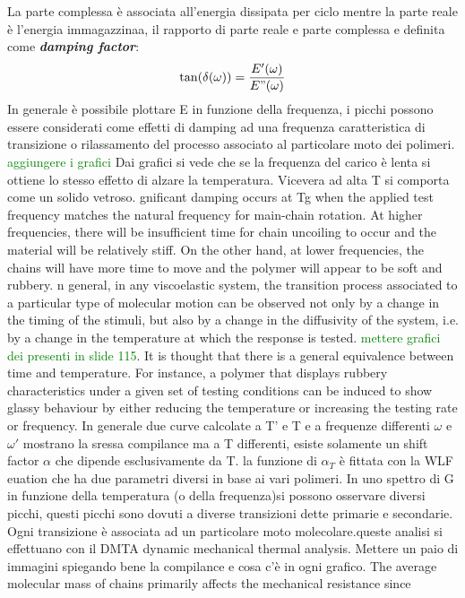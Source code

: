 La parte complessa è associata all'energia dissipata per ciclo mentre la parte reale è l'energia immagazzinaa, il rapporto di parte reale e parte complessa e definita come \textbf{\textit{damping factor}}:
\begin{equation}
    \tan(\delta(\omega))=\frac{E'(\omega)}{E"(\omega)}
\end{equation}
In generale è possibile plottare E in funzione della frequenza, i picchi possono essere considerati come effetti di damping ad una frequenza caratteristica di transizione o rilassamento del processo associato al particolare moto dei polimeri.
\textcolor{green}{aggiungere i grafici} Dai grafici si vede che se la frequenza del carico è lenta si ottiene lo stesso effetto di alzare la temperatura. Vicevera ad alta T si comporta come un solido vetroso.
gnificant damping occurs at Tg when the applied test frequency matches the 
natural frequency for main-chain rotation. At higher frequencies, there will be 
insufficient time for chain uncoiling to occur and the material will be relatively 
stiff. On the other hand, at lower frequencies, the chains will have more time 
to move and the polymer will appear to be soft and rubbery. n general, in any viscoelastic system, the transition process associated to a 
particular type of molecular motion can be observed not only by a change in 
the timing of the stimuli, but also by a change in the diffusivity of the system, 
i.e. by a change in the temperature at which the response is tested. \textcolor{green}{mettere grafici dei presenti in slide 115}. It is thought that there is a general equivalence between time and temperature. 
For instance, a polymer that displays rubbery characteristics under a given set 
of testing conditions can be induced to show glassy behaviour by either 
reducing the temperature or increasing the testing rate or frequency. 
In generale due curve calcolate a T' e T e a frequenze differenti $\omega$ e $\omega'$ mostrano la sressa compilance ma a T differenti, esiste solamente un shift factor $\alpha$ che dipende esclusivamente da T. la funzione di $\alpha_T$ è fittata con la WLF euation che ha due parametri diversi in base ai vari polimeri. In uno spettro di G in funzione della temperatura (o della frequenza)si possono osservare diversi picchi, questi picchi sono dovuti a diverse transizioni dette primarie e secondarie. Ogni transizione è associata ad un particolare moto molecolare.queste analisi si effettuano con il DMTA dynamic mechanical thermal analysis. Mettere un paio di immagini spiegando bene la compilance e cosa c'è in ogni grafico.  The average molecular mass of chains primarily affects the mechanical resistance since 
